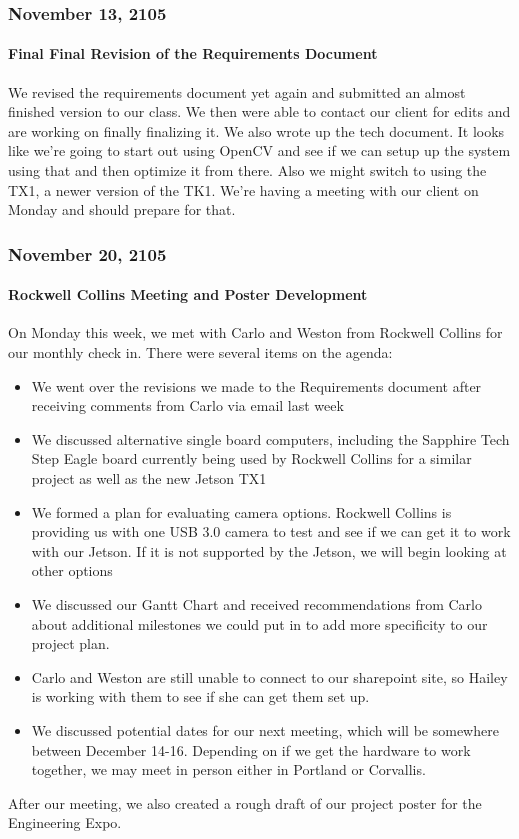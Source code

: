 \subsubsection{November 13, 2105}
\paragraph{Final Final Revision of the Requirements Document}
We revised the requirements document yet again and submitted an almost finished version to our class. We then were able to contact our client for edits and are working on finally finalizing it. We also wrote up the tech document. It looks like we're going to start out using OpenCV and see if we can setup up the system using that and then optimize it from there. Also we might switch to using the TX1, a newer version of the TK1.
We're having a meeting with our client on Monday and should prepare for that.\\

\subsubsection{November 20, 2105}
\paragraph{Rockwell Collins Meeting and Poster Development}
On Monday this week, we met with Carlo and Weston from Rockwell Collins for our monthly check in. There were several items on the agenda:

\begin{itemize}[leftmargin=2cm,labelindent=2cm]
\item We went over the revisions we made to the Requirements document after receiving comments from Carlo via email last week
\item We discussed alternative single board computers, including the Sapphire Tech Step Eagle board currently being used by Rockwell Collins for a similar project as well as the new Jetson TX1
\item We formed a plan for evaluating camera options. Rockwell Collins is providing us with one USB 3.0 camera to test and see if we can get it to work with our Jetson. If it is not supported by the Jetson, we will begin looking at other options
\item We discussed our Gantt Chart and received recommendations from Carlo about additional milestones we could put in to add more specificity to our project plan. 
\item Carlo and Weston are still unable to connect to our sharepoint site, so Hailey is working with them to see if she can get them set up.
\item We discussed potential dates for our next meeting, which will be somewhere between December 14-16.  Depending on if we get the hardware to work together, we may meet in person either in Portland or Corvallis.
\end{itemize}
After our meeting, we also created a rough draft of our project poster for the Engineering Expo.\\


